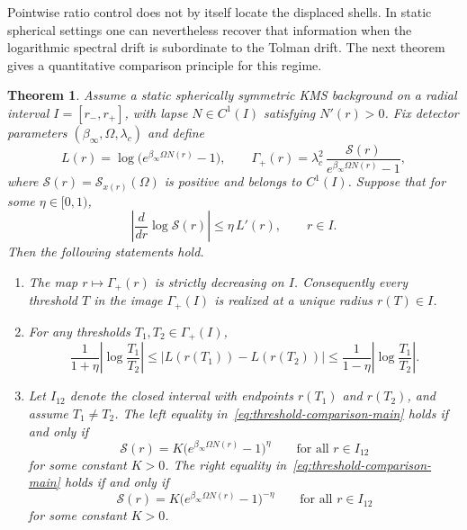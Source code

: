 \documentclass[11pt]{article}
\newtheorem{theorem}{Theorem}[section]
\theoremstyle{definition}
\begin{document}
Pointwise ratio control does not by itself locate the displaced shells. In static spherical settings one can nevertheless recover that information when the logarithmic spectral drift is subordinate to the Tolman drift. The next theorem gives a quantitative comparison principle for this regime.

\begin{theorem}\label{thm:spectral-drift-main}
Assume a static spherically symmetric KMS background on a radial interval $I=[r_-,r_+]$, with lapse $N\in C^1(I)$ satisfying $N'(r)>0$. Fix detector parameters $(\beta_\infty,\Omega,\lambda_c)$ and define
\[
L(r)=\log\!\bigl(e^{\beta_\infty\Omega N(r)}-1\bigr),
\qquad
\Gamma_+(r)=\lambda_c^2\,
\frac{\mathcal S(r)}{e^{\beta_\infty\Omega N(r)}-1},
\]
where $\mathcal S(r)=\mathcal S_{x(r)}(\Omega)$ is positive and belongs to $C^1(I)$. Suppose that for some $\eta\in[0,1)$,
\begin{equation}\label{eq:log-slope-control-main}
\left|\frac{d}{dr}\log\mathcal S(r)\right|
\le
\eta\,L'(r),
\qquad r\in I.
\end{equation}
Then the following statements hold.
\begin{enumerate}[label=\textup{(\roman*)},leftmargin=2.2em,itemsep=0.25em]
\item The map $r\mapsto\Gamma_+(r)$ is strictly decreasing on $I$. Consequently every threshold $T$ in the image $\Gamma_+(I)$ is realized at a unique radius $r(T)\in I$.
\item For any thresholds $T_1,T_2\in\Gamma_+(I)$,
\begin{equation}\label{eq:threshold-comparison-main}
\frac{1}{1+\eta}\left|\log\frac{T_1}{T_2}\right|
\le
\left|L(r(T_1))-L(r(T_2))\right|
\le
\frac{1}{1-\eta}\left|\log\frac{T_1}{T_2}\right|.
\end{equation}
\item Let $I_{12}$ denote the closed interval with endpoints $r(T_1)$ and $r(T_2)$, and assume $T_1\neq T_2$. The left equality in~\eqref{eq:threshold-comparison-main} holds if and only if
\begin{equation}\label{eq:extremal-plus-main}
\mathcal S(r)=K\bigl(e^{\beta_\infty\Omega N(r)}-1\bigr)^{\eta}
\qquad\text{for all }r\in I_{12}
\end{equation}
for some constant $K>0$. The right equality in~\eqref{eq:threshold-comparison-main} holds if and only if
\begin{equation}\label{eq:extremal-minus-main}
\mathcal S(r)=K\bigl(e^{\beta_\infty\Omega N(r)}-1\bigr)^{-\eta}
\qquad\text{for all }r\in I_{12}
\end{equation}
for some constant $K>0$.
\end{enumerate}
\end{theorem}
\end{document}
